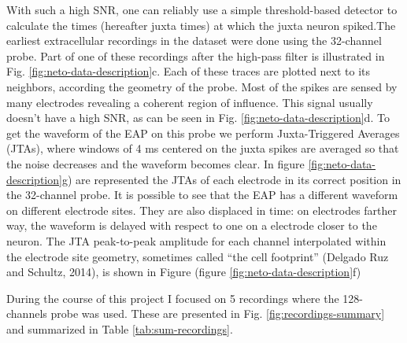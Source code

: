 \documentclass{report}
\begin{document}
With such a high SNR, one can reliably use a simple threshold-based detector to calculate the times (hereafter juxta times) at which the juxta neuron spiked.The earliest extracellular recordings in the dataset were done using the 32-channel probe. Part of one of these recordings after the high-pass filter is illustrated in Fig. \ref{fig:neto-data-description}c.  Each of these traces are plotted next to its neighbors, according the geometry of the probe. Most of the spikes are sensed by many electrodes revealing a coherent region of influence. This signal usually doesn't have a high SNR, as can be seen in Fig. \ref{fig:neto-data-description}d. To get the waveform of the EAP on this probe we perform Juxta-Triggered Averages (JTAs), where windows of 4 ms centered on the juxta spikes are averaged so that the noise decreases and the waveform becomes clear. In figure \ref{fig:neto-data-description}g) are represented the JTAs of each electrode in its correct position in the 32-channel probe. It is possible to see that the EAP has a different waveform on different electrode sites. They are also displaced in time: on electrodes farther way, the waveform is delayed with respect to one on a electrode closer to the neuron. The JTA peak-to-peak amplitude for each channel interpolated within the electrode site geometry, sometimes called “the cell footprint” (Delgado Ruz and Schultz, 2014), is shown in Figure (figure \ref{fig:neto-data-description}f)

During the course of this project I focused on 5 recordings where the 128-channels probe was used. These are presented in Fig. \ref{fig:recordings-summary} and summarized in Table \ref{tab:sum-recordings}.
\end{document}
